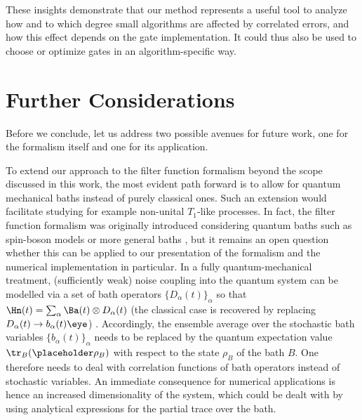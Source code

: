 These insights demonstrate that our method represents a useful tool to analyze how and to which degree small algorithms are affected by correlated errors, and how this effect depends on the gate implementation. It could thus also be used to choose or optimize gates in an algorithm-specific way.

\section{Further Considerations}\label{sec:considerata}
Before we conclude, let us address two possible avenues for future work, one for the formalism itself and one for its application.

To extend our approach to the filter function formalism beyond the scope discussed in this work, the most evident path forward is to allow for quantum mechanical baths instead of purely classical ones. Such an extension would facilitate studying for example non-unital $T_1$-like processes. In fact, the filter function formalism was originally introduced considering quantum baths such as spin-boson models \cite{Martinis2003,Uhrig2007} or more general baths \cite{Kofman2001,Yuge2011,Paz-Silva2017}, but it remains an open question whether this can be applied to our presentation of the formalism and the numerical implementation in particular. In a fully quantum-mechanical treatment, (sufficiently weak) noise coupling into the quantum system can be modelled via a set of bath operators $\{D_\alpha(t)\}_\alpha$ so that $\Hn(t) = \sum_\alpha\Ba(t)\otimes D_\alpha(t)$ (the classical case is recovered by replacing $D_\alpha(t)\rightarrow b_\alpha(t)\eye$) \cite{Breuer2007}. Accordingly, the ensemble average over the stochastic bath variables $\{b_\alpha(t)\}_\alpha$ needs to be replaced by the quantum expectation value $\tr_B(\placeholder\rho_B)$ with respect to the state $\rho_B$ of the bath $B$. One therefore needs to deal with correlation functions of bath operators instead of stochastic variables. An immediate consequence for numerical applications is hence an increased dimensionality of the system, which could be dealt with by using analytical expressions for the partial trace over the bath.

